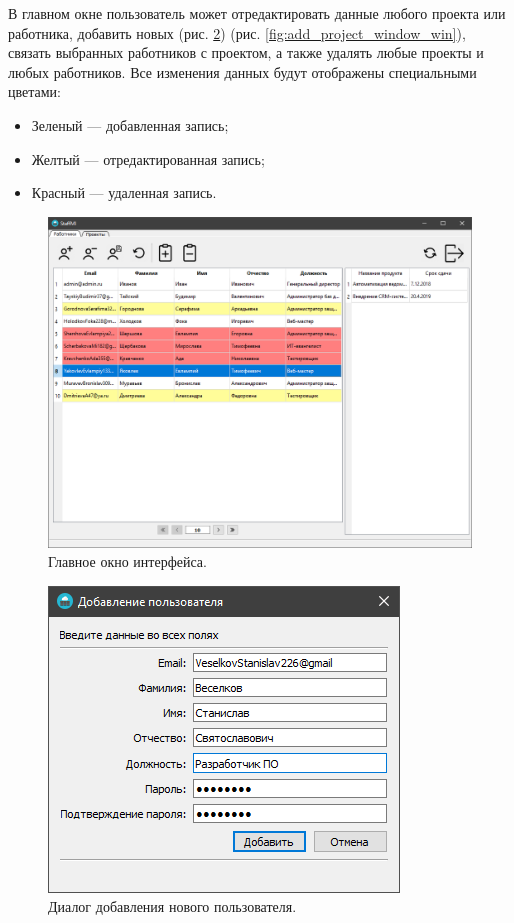 В главном окне пользователь может отредактировать данные любого проекта или работника,
добавить новых (рис. \ref{fig:add_user_window_win}) (рис. \ref{fig:add_project_window_win}), связать выбранных работников с проектом,
а также удалять любые проекты и любых работников. Все изменения данных будут отображены специальными цветами:
\begin{itemize}
    \item Зеленый --- добавленная запись;
    \item Желтый --- отредактированная запись;
    \item Красный --- удаленная запись.
\end{itemize}

\begin{figure}[h]
    \centering
    \includegraphics[width=1\linewidth]{img/main_window_win.png}
    \caption{Главное окно интерфейса.}
    \label{fig:main_window_win}
\end{figure}

\begin{figure}[h]
    \centering
    \includegraphics[width=0.5\linewidth]{img/add_user_window_win.png}
    \caption{Диалог добавления нового пользователя.}
    \label{fig:add_user_window_win}
\end{figure}

